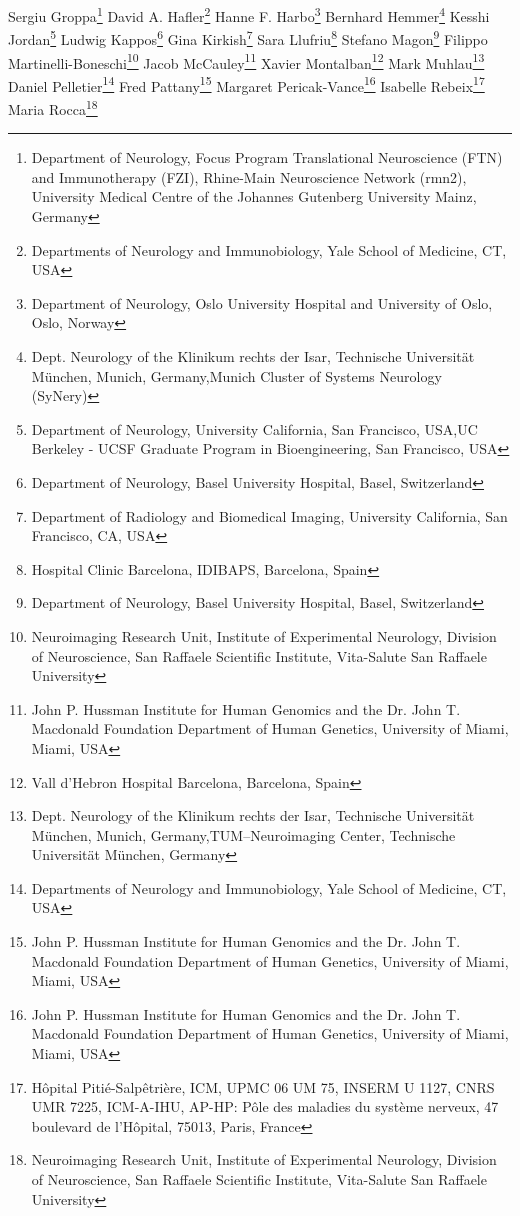 Sergiu Groppa\footnote[17]{Department of Neurology, Focus Program Translational Neuroscience (FTN) and Immunotherapy (FZI), Rhine-Main Neuroscience Network (rmn2), University Medical Centre of the Johannes Gutenberg University Mainz, Germany}
David A. Hafler\footnote[18]{Departments of Neurology and Immunobiology, Yale School of Medicine, CT, USA}
Hanne F. Harbo\footnote[19]{Department of Neurology, Oslo University Hospital and University of Oslo, Oslo, Norway}
Bernhard Hemmer\footnote[20,21]{Dept. Neurology of the  Klinikum rechts der Isar, Technische Universität München, Munich, Germany,Munich Cluster of Systems Neurology (SyNery)}
Kesshi Jordan\footnote[1,2]{Department of Neurology, University California, San Francisco,  USA,UC Berkeley - UCSF Graduate Program in Bioengineering, San Francisco, USA}
Ludwig Kappos\footnote[6]{Department of Neurology, Basel University Hospital, Basel, Switzerland}
Gina Kirkish\footnote[11]{Department of Radiology and Biomedical Imaging, University California, San Francisco, CA, USA}
Sara Llufriu\footnote[22]{Hospital Clinic Barcelona, IDIBAPS, Barcelona, Spain}
Stefano Magon\footnote[6]{Department of Neurology, Basel University Hospital, Basel, Switzerland}
Filippo Martinelli-Boneschi\footnote[14]{Neuroimaging Research Unit, Institute of Experimental Neurology, Division of Neuroscience, San Raffaele Scientific Institute, Vita-Salute San Raffaele University}
Jacob McCauley\footnote[23]{John P. Hussman Institute for Human Genomics and the Dr. John T. Macdonald Foundation Department of Human Genetics, University of Miami, Miami, USA}
Xavier Montalban\footnote[10]{Vall d’Hebron Hospital Barcelona, Barcelona, Spain}
Mark Muhlau\footnote[20,24]{Dept. Neurology of the  Klinikum rechts der Isar, Technische Universität München, Munich, Germany,TUM–Neuroimaging Center, Technische Universität München, Germany}
Daniel Pelletier\footnote[18]{Departments of Neurology and Immunobiology, Yale School of Medicine, CT, USA}
Fred Pattany\footnote[23]{John P. Hussman Institute for Human Genomics and the Dr. John T. Macdonald Foundation Department of Human Genetics, University of Miami, Miami, USA}
Margaret Pericak-Vance\footnote[23]{John P. Hussman Institute for Human Genomics and the Dr. John T. Macdonald Foundation Department of Human Genetics, University of Miami, Miami, USA}
Isabelle Rebeix\footnote[15]{Hôpital Pitié-Salpêtrière, ICM, UPMC 06 UM 75, INSERM U 1127, CNRS UMR 7225, ICM-A-IHU, AP-HP: Pôle des maladies du système nerveux, 47 boulevard de l'Hôpital, 75013, Paris, France}
Maria Rocca\footnote[14]{Neuroimaging Research Unit, Institute of Experimental Neurology, Division of Neuroscience, San Raffaele Scientific Institute, Vita-Salute San Raffaele University}
